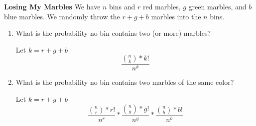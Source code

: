 \question \textbf{Losing My Marbles}
We have $n$ bins and $r$ red marbles, $g$ green marbles, and $b$ blue marbles. We randomly throw the $r +g+b$ marbles into the $n$ bins. 
\begin{enumerate}[label=(\alph*)]
\item What is the probability no bin contains two (or more) marbles? 
\begin{solution}
Let $k = r + g + b$
\[\frac{{n \choose k} * k!}{n^k}\]
\end{solution}

\item What is the probability no bin contains two marbles of the same color?
\begin{solution}
Let $k = r + g + b$
\[\frac{{n \choose r} * r!}{n^r} * \frac{{n \choose g} * g!}{n^g} * \frac{{n \choose b} * b!}{n^b} \]
\end{solution}

\end{enumerate}